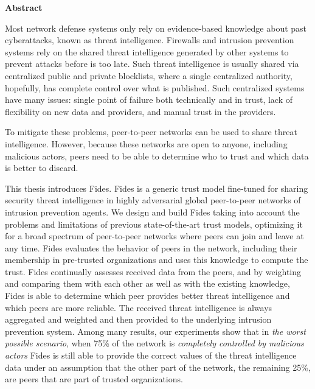 \newenvironment{abstract}[1]
  {\bigskip
   \begin{center}\bfseries#1\end{center}\small\leftskip=0.5cm\rightskip=0.5cm}
  {\par\bigskip}

\providecommand{\keywords}[2]{\footnotesize\textbf{\textit{#1:}} #2}

\begin{abstract}{Abstract}

Most network defense systems only rely on evidence-based knowledge about past cyberattacks, known as threat intelligence. Firewalls and intrusion prevention systems rely on the shared threat intelligence generated by other systems to prevent attacks before is too late.
Such threat intelligence is usually shared via centralized public and private blocklists, where a single centralized authority, hopefully, has complete control over what is published. Such centralized systems have many issues: single point of failure both technically and in trust, lack of flexibility on new data and providers, and manual trust in the providers.

To mitigate these problems, peer-to-peer networks can be used to share threat intelligence. However, because these networks are open to anyone, including malicious actors, peers need to be able to determine who to trust and which data is better to discard.

This thesis introduces Fides. Fides is a generic trust model fine-tuned for sharing security threat intelligence in highly adversarial global peer-to-peer networks of intrusion prevention agents.
We design and build Fides taking into account the problems and limitations of previous state-of-the-art trust models, optimizing it for a broad spectrum of peer-to-peer networks where peers can join and leave at any time.
Fides evaluates the behavior of peers in the network, including their membership in pre-trusted organizations and uses this knowledge to compute the trust.
Fides continually assesses received data from the peers, and by weighting and comparing them with each other as well as with the existing knowledge, Fides is able to determine which peer provides better threat intelligence and which peers are more reliable. The received threat intelligence is always aggregated and weighted and then provided to the underlying intrusion prevention system.
Among many results, our experiments show that in \textit{the worst possible scenario}, when 75\% of the network is \textit{completely controlled by malicious actors} Fides is still able to provide the correct values of the threat intelligence data under an assumption that the other part of the network, the remaining 25\%, are peers that are part of trusted organizations.


\end{abstract}
